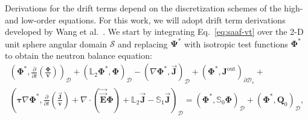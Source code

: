 Derivations for the drift terms depend on the discretization schemes of the high- and low-order
equations. For this work, we will adopt drift term derivations developed by Wang et al.\
\cite{wang_diffusion_2014, wang_rattlesnake_2018}. We start by integrating Eq.\ \ref{eq:saaf-vt}
over the 2-D unit sphere angular domain $\mathcal{S}$ and replacing $\bm{\Psi}^*$ with isotropic
test functions $\bm{\Phi}^*$ to obtain the neutron balance equation:
%
\begin{multline}
  \left(\bm{\Phi}^*,\frac{\partial}{\partial t}\left(\frac{\bm{\Phi}}{\bm{v}}\right)\right)_\mathcal{D}
  + \left(\mathbb{L}_2\bm{\Phi}^*,\bm{\Phi}\right)_\mathcal{D}
  - \left(\nabla\bm{\Phi}^*,\vec{\bm{J}}\right)_\mathcal{D}
  + \left(\bm{\Phi}^*,\bm{J}^\text{out}\right)_{\partial\mathcal{D}_v} + \\
  \left(\bm{\tau}\nabla\bm{\Phi}^*, \frac{\partial}{\partial t}\left(\frac{\vec{\bm{J}}}{\bm{v}}\right)
    + \nabla\cdot(\vec{\vec{\bm{E}}}\bm{\Phi}) +\mathbb{L}_2\vec{\bm{J}} -
    \mathbb{S}_1\vec{\bm{J}}\right)_\mathcal{D}
  = \left(\bm{\Phi}^*,\mathbb{S}_0\bm{\Phi}\right)_\mathcal{D}
  + \left(\bm{\Phi}^*,\bm{Q}_0\right)_\mathcal{D},
\end{multline}
%
